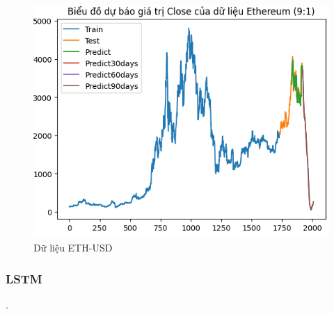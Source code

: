 \documentclass[conference]{IEEEtran}
\begin{document}
\begin{figure}[H]
\begin{minipage}{0.15\textwidth}
    \includegraphics[width=1\textwidth]{Figure/ETH91.png}
    \end{minipage}
    \caption{Dữ liệu ETH-USD}
    \label{fig:1}
\end{figure}

\subsubsection{LSTM}.
\end{document}

